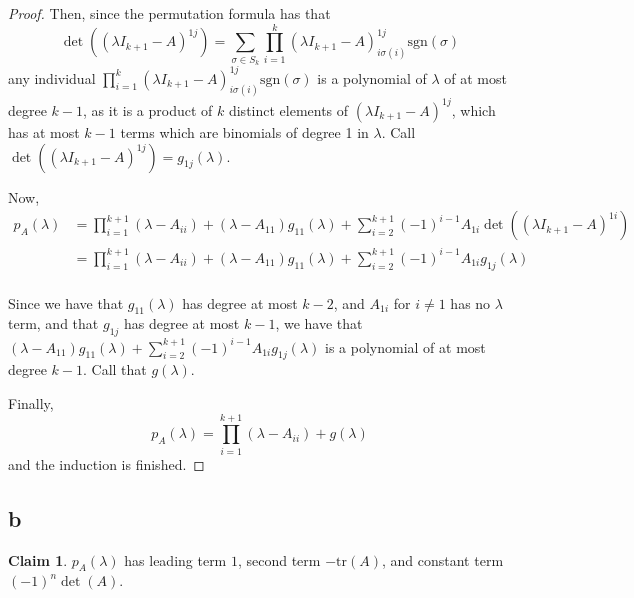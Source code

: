 \documentclass[12pt,letterpaper]{article}
\theoremstyle{definition}
\newtheorem*{claim}{Claim}
\newcommand{\tr}{\mathrm{tr}}
\begin{document}
\begin{proof}
  Then, since the permutation formula has that \[
    \det((\lambda I_{k+1} - A)^{1j}) = \sum_{\sigma \in
      S_k}\prod_{i=1}^k(\lambda I_{k+1} - A)^{1j}_{i\sigma(i)}\text{sgn}(\sigma) 
  \]
  any individual $\prod_{i=1}^k(\lambda I_{k+1} -
  A)^{1j}_{i\sigma(i)}\text{sgn}(\sigma)$ is a polynomial of $\lambda$ of at
  most degree $k - 1$, as it is a product of $k$ distinct elements of $(\lambda
  I_{k+1} - A)^{1j}$, which has at most $k - 1$ terms which are binomials of
  degree 1 in $\lambda$. Call $\det((\lambda I_{k+1} - A)^{1j}) = g_{1j}(\lambda)$.
  
  Now,
  \begin{align*}
    p_A(\lambda) &= \prod_{i=1}^{k+1}(\lambda - A_{ii}) +
                   (\lambda - A_{11})g_{11}(\lambda) + \sum_{i=2}^{k+1}(-1)^{i-1}A_{1i}\det((\lambda I_{k+1} -
                   A)^{1i}) \\
                 &= \prod_{i=1}^{k+1}(\lambda - A_{ii}) +
                   (\lambda - A_{11})g_{11}(\lambda) + \sum_{i=2}^{k+1}(-1)^{i-1}A_{1i}g_{1j}(\lambda) \\
  \end{align*}

  Since we have that $g_{11}(\lambda)$ has degree at most $k - 2$, and $A_{1i}$
  for $i \neq 1$ has no $\lambda$ term, and that $g_{1j}$ has degree at most $k - 1$,
  we have that $(\lambda - A_{11})g_{11}(\lambda) +
  \sum_{i=2}^{k+1}(-1)^{i-1}A_{1i}g_{1j}(\lambda)$ is a polynomial of at most
  degree $k - 1$. Call that $g(\lambda)$.

  Finally,
  \[
    p_A(\lambda) = \prod_{i=1}^{k+1}(\lambda - A_{ii}) + g(\lambda)
  \]
  and the induction is finished.
\end{proof}

\subsection*{b}

\begin{claim}
  $p_A(\lambda)$ has leading term $1$, second term $-\tr(A)$, and constant term
  $(-1)^n\det(A)$.
\end{claim}
\end{document}
